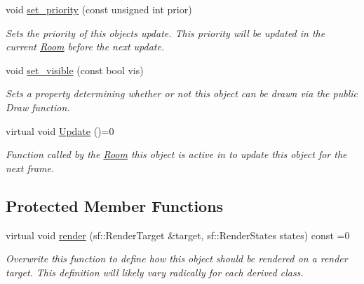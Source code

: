\begin{DoxyCompactItemize}
void \hyperlink{class_helios_1_1_base_obj_ad3335cdcb1dfc4ee7e749dbb32f8cd2a}{set\+\_\+priority} (const unsigned int prior)
\begin{DoxyCompactList}\small\item\em Sets the priority of this object\textquotesingle{}s update. This priority will be updated in the current \hyperlink{class_helios_1_1_room}{Room} before the next update. \end{DoxyCompactList}\item 
void \hyperlink{class_helios_1_1_base_obj_a354767a20905778fefe96fe895a382ae}{set\+\_\+visible} (const bool vis)
\begin{DoxyCompactList}\small\item\em Sets a property determining whether or not this object can be drawn via the public Draw function. \end{DoxyCompactList}\item 
\hypertarget{class_helios_1_1_base_obj_aa42e26e872234b6871d159c29afdef17}{}virtual void \hyperlink{class_helios_1_1_base_obj_aa42e26e872234b6871d159c29afdef17}{Update} ()=0\label{class_helios_1_1_base_obj_aa42e26e872234b6871d159c29afdef17}

\begin{DoxyCompactList}\small\item\em Function called by the \hyperlink{class_helios_1_1_room}{Room} this object is active in to update this object for the next frame. \end{DoxyCompactList}\end{DoxyCompactItemize}
\subsection*{Protected Member Functions}
\begin{DoxyCompactItemize}
\item 
\hypertarget{class_helios_1_1_base_obj_af7355477f06d38692dc6cdb6f99dbd11}{}virtual void \hyperlink{class_helios_1_1_base_obj_af7355477f06d38692dc6cdb6f99dbd11}{render} (sf\+::\+Render\+Target \&target, sf\+::\+Render\+States states) const  =0\label{class_helios_1_1_base_obj_af7355477f06d38692dc6cdb6f99dbd11}

\begin{DoxyCompactList}\small\item\em Overwrite this function to define how this object should be rendered on a render target. This definition will likely vary radically for each derived class. \end{DoxyCompactList}\end{DoxyCompactItemize}

